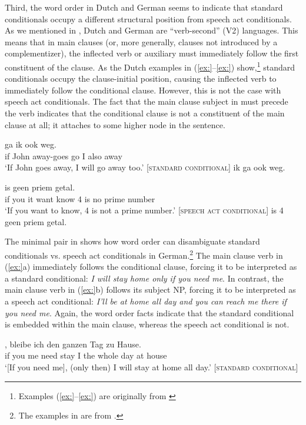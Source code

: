 Third, the word order in Dutch and German seems to indicate that standard conditionals occupy a different structural position from speech act conditionals. As we mentioned in , Dutch and German are “verb-second” (V2) languages. This means that in main clauses (or, more generally, clauses not introduced by a complementizer), the inflected verb or auxiliary must immediately follow the first constituent of the clause. As the Dutch examples in (\ref{ex:}--\ref{ex:}) show,\footnote{Examples (\ref{ex:}--\ref{ex:}) are originally from \citet[ch. 2]{Iatridou1991}} standard conditionals occupy the clause-initial position, causing the inflected verb to immediately follow the conditional clause. However, this is not the case with speech act conditionals. The fact that the main clause subject in  must precede the verb indicates that the conditional clause is not a constituent of the main clause at all; it attaches to some higher node in the sentence.


\ea
\ea {}  ga  ik  ook  weg.\\
 if  John  away-goes  go  I  also  away\\
\glt ‘If John goes away, I will go away too.’    [\textsc{standard conditional}]
 ik ga ook weg.
\z \z

\ea
\ea {}  is  geen  priem  getal.\\
 if  you  it  want  know  4  is  no  prime  number\\
\glt ‘If you want to know, 4 is not a prime number.’  [\textsc{speech act} \textsc{conditional}]
 is 4 geen priem getal.
\z \z


The minimal pair in  shows how word order can disambiguate standard conditionals vs. speech act conditionals in German.\footnote{The examples in  are from \citet[102]{Scheffler2013}.} The main clause verb in (\ref{ex:}a) immediately follows the conditional clause, forcing it to be interpreted as a standard conditional: \textit{I will stay home only if you need me}. In contrast, the main clause verb in (\ref{ex:}b) follows its subject NP, forcing it to be interpreted as a speech act conditional: \textit{I’ll be at home all day and you can reach me there if you need me}. Again, the word order facts indicate that the standard conditional is embedded within the main clause, whereas the speech act conditional is not.


\ea
\ea  \gll{},  bleibe  ich  den  ganzen  Tag  zu  Hause.\\
 if  you  me  need  stay  I  the  whole  day  at  house\\
\glt ‘[If you need me], (only then) I will stay at home all day.’  [\textsc{standard conditional}]

